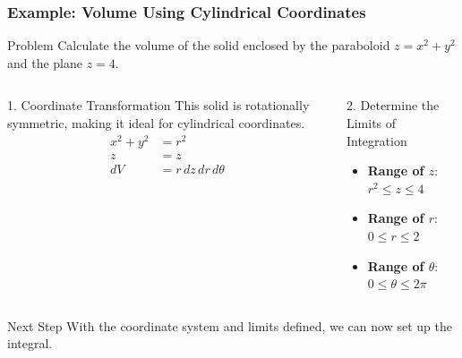 \documentclass[aspectratio=169, UTF8]{beamer}
\begin{document}
\begin{frame}
\frametitle{Example: Volume Using Cylindrical Coordinates}

\begin{block}{Problem}
    Calculate the volume of the solid enclosed by the paraboloid $z = x^2 + y^2$ and the plane $z = 4$.
\end{block}

\begin{columns}[T]
    \begin{column}{0.5\textwidth}
        \begin{block}{1. Coordinate Transformation}
            This solid is rotationally symmetric, making it ideal for cylindrical coordinates.
            \begin{align*}
                x^2 + y^2 &= r^2 \\
                z &= z \\
                dV &= r \, dz \, dr \, d\theta
            \end{align*}
        \end{block}
    \end{column}
    
    \begin{column}{0.5\textwidth}
        \begin{block}{2. Determine the Limits of Integration}
            \begin{itemize}
                \item \textbf{Range of $z$}: \\ $r^2 \le z \le 4$
                \item \textbf{Range of $r$}: \\ $0 \le r \le 2$
                \item \textbf{Range of $\theta$}: \\ $0 \le \theta \le 2\pi$
            \end{itemize}
        \end{block}
    \end{column}
\end{columns}

\begin{alertblock}{Next Step}
    With the coordinate system and limits defined, we can now set up the integral.
\end{alertblock}
\end{frame}
\end{document}
